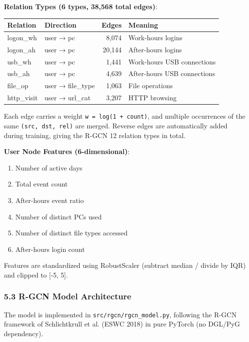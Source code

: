 \documentclass[
  a4paper,
  11pt]{article}
\newcounter{none} %
\providecommand{\tightlist}{%
  \setlength{\itemsep}{0pt}\setlength{\parskip}{0pt}}
\begin{document}
\textbf{Relation Types (6 types, 38,568 total edges)}:

{\def\LTcaptype{none} %
\begin{longtable}[]{@{}llrl@{}}
\toprule\noalign{}
Relation & Direction & Edges & Meaning \\
\midrule\noalign{}
\endhead
\bottomrule\noalign{}
\endlastfoot
logon\_wh & user → pc & 8,074 & Work-hours logins \\
logon\_ah & user → pc & 20,144 & After-hours logins \\
usb\_wh & user → pc & 1,441 & Work-hours USB connections \\
usb\_ah & user → pc & 4,639 & After-hours USB connections \\
file\_op & user → file\_type & 1,063 & File operations \\
http\_visit & user → url\_cat & 3,207 & HTTP browsing \\
\end{longtable}
}

Each edge carries a weight \texttt{w\ =\ log(1\ +\ count)}, and multiple
occurrences of the same \texttt{(src,\ dst,\ rel)} are merged. Reverse
edges are automatically added during training, giving the R-GCN 12
relation types in total.

\textbf{User Node Features (6-dimensional)}:

\begin{enumerate}
\def\labelenumi{\arabic{enumi}.}
\tightlist
\item
  Number of active days
\item
  Total event count
\item
  After-hours event ratio
\item
  Number of distinct PCs used
\item
  Number of distinct file types accessed
\item
  After-hours login count
\end{enumerate}

Features are standardized using RobustScaler (subtract median / divide
by IQR) and clipped to {[}-5, 5{]}.

\subsubsection{5.3 R-GCN Model
Architecture}\label{53-r-gcn-model-architecture}

The model is implemented in \texttt{src/rgcn/rgcn\_model.py}, following
the R-GCN framework of Schlichtkrull et al. (ESWC 2018) in pure PyTorch
(no DGL/PyG dependency).
\end{document}
